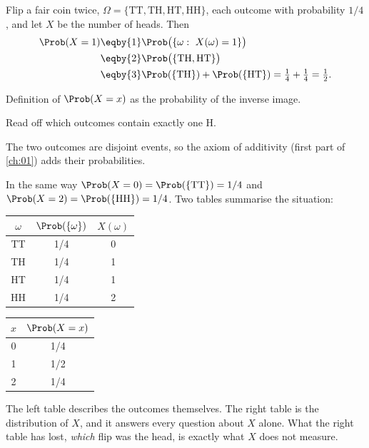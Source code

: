 \label{1b:ex:two-flips}
Flip a fair coin twice, $\Omega=\{\mathrm{TT},\mathrm{TH},\mathrm{HT},\mathrm{HH}\}$,
each outcome with probability $1/4$, and let $X$ be the number of heads. Then
\begin{align*}
  \Prob(X=1)
  &\eqby{1} \Prob\bigl(\{\omega:\ X(\omega)=1\}\bigr)\\
  &\eqby{2} \Prob\bigl(\{\mathrm{TH},\mathrm{HT}\}\bigr)\\
  &\eqby{3} \Prob(\{\mathrm{TH}\})+\Prob(\{\mathrm{HT}\})
   = \tfrac14+\tfrac14=\tfrac12 .
\end{align*}
\begin{explain}
  \item Definition of $\Prob(X=x)$ as the probability of the inverse image.
  \item Read off which outcomes contain exactly one H.
  \item The two outcomes are disjoint events, so the axiom of additivity
        (first part of \cref{ch:01}) adds their probabilities.
\end{explain}
In the same way $\Prob(X=0)=\Prob(\{\mathrm{TT}\})=1/4$ and
$\Prob(X=2)=\Prob(\{\mathrm{HH}\})=1/4$. Two tables summarise the situation:
\begin{center}
\begin{tabular}{c|c|c}
$\omega$ & $\Prob(\{\omega\})$ & $X(\omega)$\\\hline
TT & 1/4 & 0\\ TH & 1/4 & 1\\ HT & 1/4 & 1\\ HH & 1/4 & 2
\end{tabular}
\qquad\qquad
\begin{tabular}{c|c}
$x$ & $\Prob(X=x)$\\\hline
0 & 1/4\\ 1 & 1/2\\ 2 & 1/4
\end{tabular}
\end{center}
The left table describes the outcomes themselves. The right table is the
distribution of $X$, and it answers every question about $X$ alone. What the
right table has lost, \emph{which} flip was the head, is exactly what $X$
does not measure.

